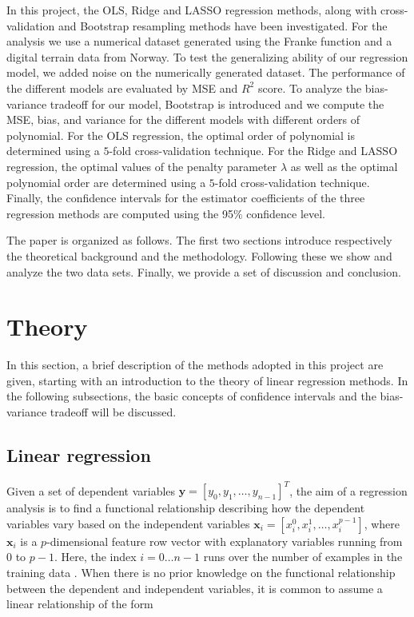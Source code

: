 \documentclass[a4paper]{article}
\begin{document}
In this project, the OLS, Ridge and LASSO regression methods, along with cross-validation and Bootstrap resampling methods have been investigated. For the analysis we use a numerical dataset generated using the Franke function and  a digital terrain data from Norway. To test the generalizing ability of our regression model, we added noise on the numerically generated dataset. The performance of the different models are evaluated by MSE and $R^2$ score. To analyze the bias-variance tradeoff for our model, Bootstrap is introduced and we compute the MSE, bias, and variance for the different models with different orders of polynomial. For the OLS regression, the optimal order of polynomial is determined using a $5$-fold cross-validation technique. For the Ridge and LASSO regression, the optimal values of the penalty parameter $\lambda$ as well as the optimal polynomial order are determined using a $5$-fold cross-validation technique. Finally, the confidence intervals for the estimator coefficients of the three regression methods are computed using the 95$\%$ confidence level. 

The paper is organized as follows. The first two sections introduce respectively the theoretical background and the methodology. Following these we show and analyze the two data sets. Finally, we provide a set of discussion and conclusion.

\section{Theory}

In this section, a brief description of the methods adopted in this project are given, starting with an introduction to the theory of linear regression methods. In the following subsections, the basic concepts of confidence intervals and the bias-variance tradeoff will be discussed.   

\subsection{Linear regression}
\label{sec_linreg}
Given a set of dependent variables $\mathbf{y}=[y_0,y_1,\dots,y_{n-1}]^T$, the aim of a regression analysis is to find a functional relationship describing how the dependent variables vary based on the independent variables $\mathbf{x}_{i} =[x_{i}^{0}, x_{i}^{1}, \dots, x_{i}^{p-1}]$, where $\mathbf{x}_{i}$ is a $p$-dimensional feature row vector with explanatory variables running from $0$ to $p-1$. Here, the index $i=0\ldots n-1$ runs over the number of examples in the training data \cite{lec}. When there is no prior knowledge on the functional relationship between the dependent and independent variables, it is common to assume a linear relationship of the form
\end{document}
